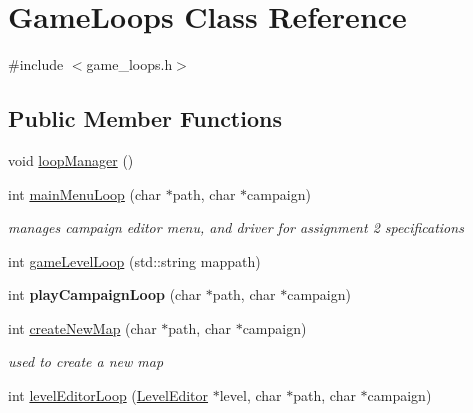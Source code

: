 \hypertarget{class_game_loops}{}\section{Game\+Loops Class Reference}
\label{class_game_loops}


{\ttfamily \#include $<$game\+\_\+loops.\+h$>$}

\subsection*{Public Member Functions}
\begin{DoxyCompactItemize}
\item 
void \hyperlink{class_game_loops_a8aa13702c60f9e77a7dea9f698556ec0}{loop\+Manager} ()
\item 
\hypertarget{class_game_loops_a0d2d3b5ba10bfa266fe069a2ab8655b1}{}\label{class_game_loops_a0d2d3b5ba10bfa266fe069a2ab8655b1} 
int \hyperlink{class_game_loops_a0d2d3b5ba10bfa266fe069a2ab8655b1}{main\+Menu\+Loop} (char $\ast$path, char $\ast$campaign)
\begin{DoxyCompactList}\small\item\em manages campaign editor menu, and driver for assignment 2 specifications \end{DoxyCompactList}\item 
int \hyperlink{class_game_loops_aeeda849e01acbbd017f46a4d9f69a9d7}{game\+Level\+Loop} (std\+::string mappath)
\item 
\hypertarget{class_game_loops_af661ca7d40601d62795023a2a15c132e}{}\label{class_game_loops_af661ca7d40601d62795023a2a15c132e} 
int {\bfseries play\+Campaign\+Loop} (char $\ast$path, char $\ast$campaign)
\item 
\hypertarget{class_game_loops_affbae87d486a36d5ad2a34a8a5f14c32}{}\label{class_game_loops_affbae87d486a36d5ad2a34a8a5f14c32} 
int \hyperlink{class_game_loops_affbae87d486a36d5ad2a34a8a5f14c32}{create\+New\+Map} (char $\ast$path, char $\ast$campaign)
\begin{DoxyCompactList}\small\item\em used to create a new map \end{DoxyCompactList}\item 
\hypertarget{class_game_loops_acda39f058e280040296d03f306fbb5f8}{}\label{class_game_loops_acda39f058e280040296d03f306fbb5f8} 
int \hyperlink{class_game_loops_acda39f058e280040296d03f306fbb5f8}{level\+Editor\+Loop} (\hyperlink{class_level_editor}{Level\+Editor} $\ast$level, char $\ast$path, char $\ast$campaign)

\end{DoxyCompactItemize}
